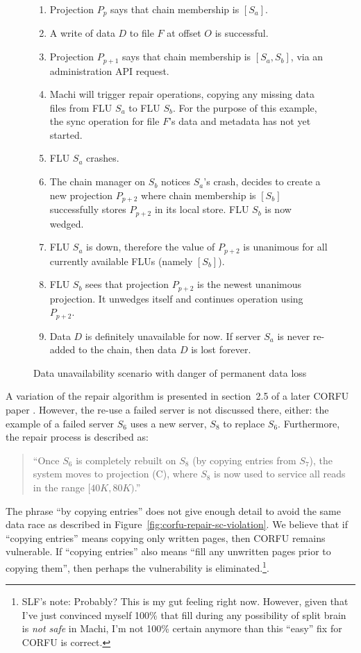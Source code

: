\documentclass[preprint,10pt]{sigplanconf}
\begin{document}
\begin{figure}
\begin{enumerate}
\item Projection $P_p$ says that chain membership is $[S_a]$.
\item A write of data $D$ to file $F$ at offset $O$ is successful.
\item Projection $P_{p+1}$ says that chain membership is $[S_a,S_b]$, via
   an administration API request.
\item Machi will trigger repair operations, copying any missing data
   files from FLU $S_a$ to FLU $S_b$.  For the purpose of this
   example, the sync operation for file $F$'s data and metadata has
   not yet started.
\item FLU $S_a$ crashes.
\item The chain manager on $S_b$ notices $S_a$'s crash,
   decides to create a new projection $P_{p+2}$ where chain membership is
   $[S_b]$
  successfully stores $P_{p+2}$ in its local store.  FLU $S_b$ is now wedged.
\item FLU $S_a$ is down, therefore the
   value of $P_{p+2}$ is unanimous for all currently available FLUs
   (namely $[S_b]$).
\item FLU $S_b$ sees that projection $P_{p+2}$ is the newest unanimous
   projection.  It unwedges itself and continues operation using $P_{p+2}$.
\item Data $D$ is definitely unavailable for now.  If server $S_a$ is
  never re-added to the chain, then data $D$ is lost forever.
\end{enumerate}
\caption{Data unavailability scenario with danger of permanent data loss}
\label{fig:data-loss2}
\end{figure}

A variation of the repair
algorithm is presented in section~2.5 of a later CORFU paper \cite{corfu2}.
However, the re-use a failed
server is not discussed there, either: the example of a failed server
$S_6$ uses a new server, $S_8$ to replace $S_6$.  Furthermore, the
repair process is described as:

\begin{quote}
``Once $S_6$ is completely rebuilt on $S_8$ (by copying entries from
  $S_7$), the system moves to projection (C), where $S_8$ is now used
  to service all reads in the range $[40K,80K)$.''
\end{quote}

The phrase ``by copying entries'' does not give enough
detail to avoid the same data race as described in
Figure~\ref{fig:corfu-repair-sc-violation}.  We believe that if
``copying entries'' means copying only written pages, then CORFU
remains vulnerable.  If ``copying entries'' also means ``fill any
unwritten pages prior to copying them'', then perhaps the
vulnerability is eliminated.\footnote{SLF's note: Probably?  This is my
  gut feeling right now.  However, given that I've just convinced
  myself 100\% that fill during any possibility of split brain is {\em
  not safe} in Machi, I'm not 100\% certain anymore than this ``easy''
  fix for CORFU is correct.}.
\end{document}
